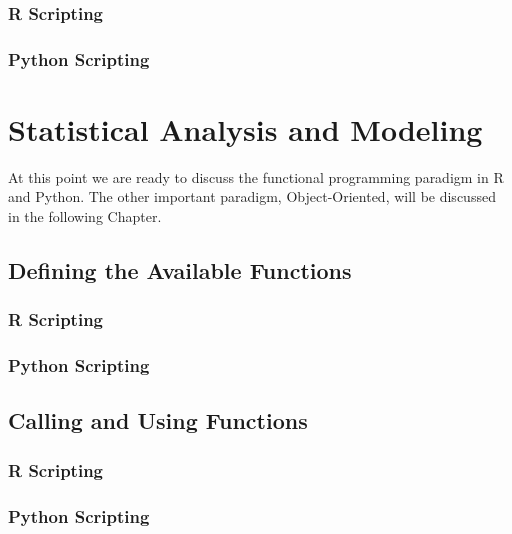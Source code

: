 \documentclass[]{book}
\theoremstyle{definition}
\theoremstyle{definition}
\theoremstyle{definition}
\theoremstyle{remark}
\begin{document}

\subsection{R Scripting}\label{r-scripting-9}

\subsection{Python Scripting}\label{python-scripting-10}

\chapter{Statistical Analysis and
Modeling}\label{statistical-analysis-and-modeling}

At this point we are ready to discuss the functional programming
paradigm in R and Python. The other important paradigm, Object-Oriented,
will be discussed in the following Chapter.

 

\section{Defining the Available
Functions}\label{defining-the-available-functions}

\subsection{R Scripting}\label{r-scripting-10}

\subsection{Python Scripting}\label{python-scripting-11}

\section{Calling and Using
Functions}\label{calling-and-using-functions-2}

\subsection{R Scripting}\label{r-scripting-11}

\subsection{Python Scripting}\label{python-scripting-12}
\end{document}
